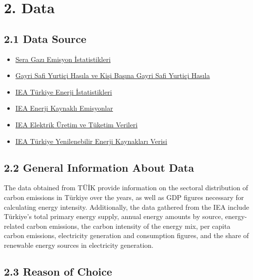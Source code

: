 \documentclass[
  letterpaper,
  DIV=11,
  numbers=noendperiod]{scrartcl}
\begin{document}
\section{2. Data}\label{data}

\subsection{2.1 Data Source}\label{data-source}

\begin{itemize}
\item
  \href{https://data.tuik.gov.tr/Bulten/Index?p=Sera-Gazi-Emisyon-Istatistikleri-1990-2023-53974}{Sera
  Gazı Emisyon İstatistikleri}
\item
  \href{https://data.tuik.gov.tr/Kategori/GetKategori?p=ulusal-hesaplar-113}{Gayri
  Safi Yurtiçi Hasıla ve Kişi Başına Gayri Safi Yurtiçi Hasıla}
\item
  \href{https://www.iea.org/countries/turkiye/energy-mix}{IEA Türkiye
  Enerji İstatistikleri}
\item
  \href{https://www.iea.org/countries/turkiye/emissions}{IEA Enerji
  Kaynaklı Emisyonlar}
\item
  \href{https://www.iea.org/countries/turkiye/electricity}{IEA Elektrik
  Üretim ve Tüketim Verileri}
\item
  \href{https://www.iea.org/countries/turkiye/renewables}{IEA Türkiye
  Yenilenebilir Enerji Kaynakları Verisi}
\end{itemize}

\subsection{2.2 General Information About
Data}\label{general-information-about-data}

The data obtained from TÜİK provide information on the sectoral
distribution of carbon emissions in Türkiye over the years, as well as
GDP figures necessary for calculating energy intensity. Additionally,
the data gathered from the IEA include Türkiye's total primary energy
supply, annual energy amounts by source, energy-related carbon
emissions, the carbon intensity of the energy mix, per capita carbon
emissions, electricity generation and consumption figures, and the share
of renewable energy sources in electricity generation.

\subsection{2.3 Reason of Choice}\label{reason-of-choice}
\end{document}
